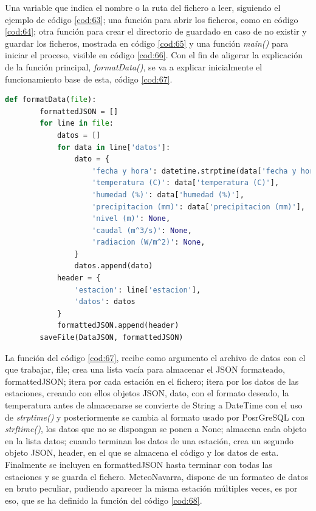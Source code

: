 Una variable que indica el nombre o la ruta del fichero a leer, siguiendo el ejemplo de código \ref{cod:63}; una función para abrir los ficheros, como en código \ref{cod:64}; otra función para crear el directorio de guardado en caso de no existir y guardar los ficheros, mostrada en código \ref{cod:65} y una función \textit{main()} para iniciar el proceso, visible en código \ref{cod:66}. Con el fin de aligerar la explicación de la función principal, \textit{formatData()}, se va a explicar inicialmente el funcionamiento base de esta, código \ref{cod:67}.

\begin{lstlisting}[language=Python, caption={Declaración función base \textit{formatData()}, concretamente esta versión es usada para formatear los datos de Aemet}, label=cod:67]
	def formatData(file):
		formattedJSON = []
		for line in file:
			datos = []
			for data in line['datos']:
				dato = {
					'fecha y hora': datetime.strptime(data['fecha y hora'], "%d/%m/%Y %H:%M:%S").strftime("%Y-%m-%d %H:%M"),
					'temperatura (C)': data['temperatura (C)'],
					'humedad (%)': data['humedad (%)'],
					'precipitacion (mm)': data['precipitacion (mm)'],
					'nivel (m)': None,
					'caudal (m^3/s)': None,
					'radiacion (W/m^2)': None,
				}
				datos.append(dato)
			header = {
				'estacion': line['estacion'],
				'datos': datos
			}
			formattedJSON.append(header)
		saveFile(DataJSON, formattedJSON)
\end{lstlisting}

La función del código \ref{cod:67}, recibe como argumento el archivo de datos con el que trabajar, file; crea una lista vacía para almacenar el JSON formateado, formattedJSON; itera por cada estación en el fichero; itera por los datos de las estaciones, creando con ellos objetos JSON, dato, con el formato deseado, la temperatura antes de almacenarse se convierte de String a DateTime con el uso de \textit{strptime()} y posteriormente se cambia al formato usado por PosrGreSQL con \textit{strftime()}, los datos que no se dispongan se ponen a None; almacena cada objeto en la lista datos; cuando terminan los datos de una estación, crea un segundo objeto JSON, header, en el que se almacena el código y los datos de esta. Finalmente se incluyen en formattedJSON hasta terminar con todas las estaciones y se guarda el fichero.\newline
\newline
MeteoNavarra, dispone de un formateo de datos en bruto peculiar, pudiendo aparecer la misma estación múltiples veces, es por eso, que se ha definido la función del código \ref{cod:68}.

